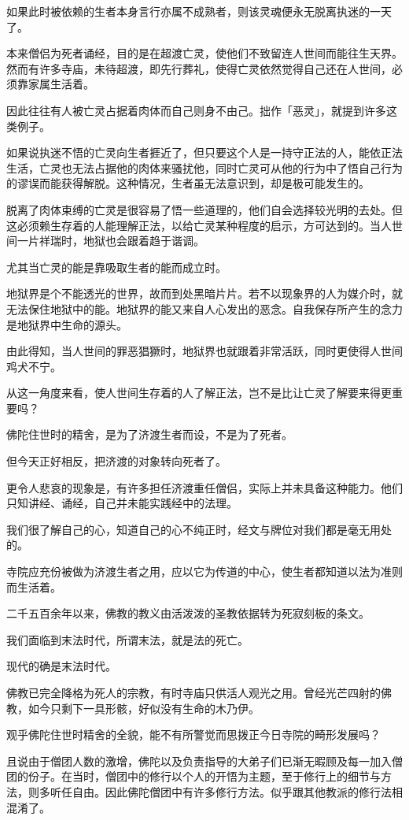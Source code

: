 \documentclass[twoside,openany]{book}
\begin{document}
如果此时被依赖的生者本身言行亦属不成熟者，则该灵魂便永无脱离执迷的一天了。

本来僧侣为死者诵经，目的是在超渡亡灵，使他们不致留连人世间而能往生天界。然而有许多寺庙，未待超渡，即先行葬礼，使得亡灵依然觉得自己还在人世间，必须靠家属生活着。

因此往往有人被亡灵占据着肉体而自己则身不由己。拙作「恶灵」，就提到许多这类例子。

如果说执迷不悟的亡灵向生者捱近了，但只要这个人是一持守正法的人，能依正法生活，亡灵也无法占据他的肉体来骚扰他，同时亡灵可从他的行为中了悟自己行为的谬误而能获得解脱。这种情况，生者虽无法意识到，却是极可能发生的。

脱离了肉体束缚的亡灵是很容易了悟一些道理的，他们自会选择较光明的去处。但这必须赖生存着的人能理解正法，以给亡灵某种程度的启示，方可达到的。当人世间一片祥瑞时，地狱也会跟着趋于谐调。

尤其当亡灵的能是靠吸取生者的能而成立时。

地狱界是个不能透光的世界，故而到处黑暗片片。若不以现象界的人为媒介时，就无法保住地狱中的能。地狱界的能又来自人心发出的恶念。自我保存所产生的念力是地狱界中生命的源头。

由此得知，当人世间的罪恶猖獗时，地狱界也就跟着非常活跃，同时更使得人世间鸡犬不宁。

从这一角度来看，使人世间生存着的人了解正法，岂不是比让亡灵了解要来得更重要吗？

佛陀住世时的精舍，是为了济渡生者而设，不是为了死者。

但今天正好相反，把济渡的对象转向死者了。

更令人悲哀的现象是，有许多担任济渡重任僧侣，实际上并未具备这种能力。他们只知讲经、诵经，自己并未能实践经中的法理。

我们很了解自己的心，知道自己的心不纯正时，经文与牌位对我们都是毫无用处的。

寺院应充份被做为济渡生者之用，应以它为传道的中心，使生者都知道以法为准则而生活着。

二千五百余年以来，佛教的教义由活泼泼的圣教依据转为死寂刻板的条文。

我们面临到末法时代，所谓末法，就是法的死亡。

现代的确是末法时代。

佛教已完全降格为死人的宗教，有时寺庙只供活人观光之用。曾经光芒四射的佛教，如今只剩下一具形骸，好似没有生命的木乃伊。

观乎佛陀住世时精舍的全貌，能不有所警觉而思拨正今日寺院的畸形发展吗？

且说由于僧团人数的激增，佛陀以及负责指导的大弟子们已渐无暇顾及每一加入僧团的份子。在当时，僧团中的修行以个人的开悟为主题，至于修行上的细节与方法，则多听任自由。因此佛陀僧团中有许多修行方法。似乎跟其他教派的修行法相混淆了。
\end{document}
